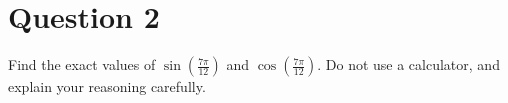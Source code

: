 \chapter{Question 2}
Find the exact values of $\sin(\frac{7\pi}{12})$ and $\cos(\frac{7\pi}{12})$.
Do not use a calculator, and explain your reasoning carefully.
